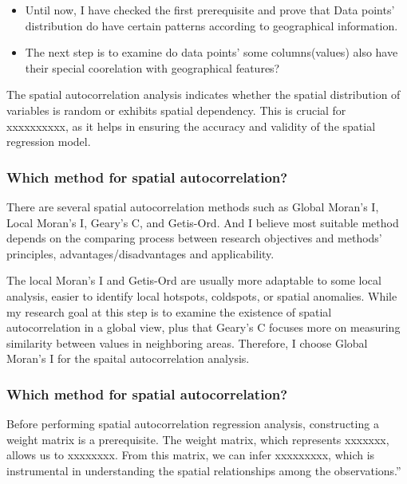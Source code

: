\documentclass[
]{article}
\providecommand{\tightlist}{%
  \setlength{\itemsep}{0pt}\setlength{\parskip}{0pt}}
\begin{document}
\begin{itemize}
\tightlist
\item
  Until now, I have checked the first prerequisite and prove that Data
  points' distribution do have certain patterns according to
  geographical information.
\item
  The next step is to examine do data points' some columns(values) also
  have their special coorelation with geographical features?
\end{itemize}

The spatial autocorrelation analysis indicates whether the spatial
distribution of variables is random or exhibits spatial dependency. This
is crucial for xxxxxxxxxx, as it helps in ensuring the accuracy and
validity of the spatial regression model.

\hypertarget{which-method-for-spatial-autocorrelation}{%
\subsubsection{Which method for spatial
autocorrelation?}\label{which-method-for-spatial-autocorrelation}}

There are several spatial autocorrelation methods such as Global Moran's
I\citep{moran_notes_1950}, Local Moran's I\citep{anselin_local_1995},
Geary's C\citep{geary_contiguity_1954}, and
Getis-Ord\citep{ord_local_1995}. And I believe most suitable method
depends on the comparing process between research objectives and
methods' principles, advantages/disadvantages and applicability.

The local Moran's I and Getis-Ord are usually more adaptable to some
local analysis, easier to identify local hotspots, coldspots, or spatial
anomalies\citep{abdulhafedh_novel_2017}. While my research goal at this
step is to examine the existence of spatial autocorrelation in a global
view, plus that Geary's C focuses more on measuring similarity between
values in neighboring areas. Therefore, I choose Global Moran's I for
the spaital autocorrelation analysis.

\hypertarget{which-method-for-spatial-autocorrelation-1}{%
\subsubsection{Which method for spatial
autocorrelation?}\label{which-method-for-spatial-autocorrelation-1}}

Before performing spatial autocorrelation regression analysis,
constructing a weight matrix is a prerequisite. The weight matrix, which
represents xxxxxxx, allows us to xxxxxxxx. From this matrix, we can
infer xxxxxxxxx, which is instrumental in understanding the spatial
relationships among the observations.''
\end{document}
